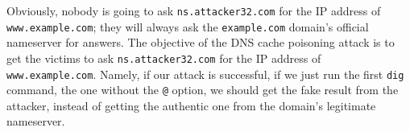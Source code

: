 Obviously, nobody is going to ask \texttt{ns.attacker32.com} for 
the IP address of \texttt{www.example.com}; they will always ask
the \texttt{example.com} domain's official nameserver for 
answers. The objective of the DNS cache poisoning attack
is to get the victims to ask 
\texttt{ns.attacker32.com} for the IP address of 
\texttt{www.example.com}. Namely, if our attack is successful, 
if we just run the first \texttt{dig} command, the one
without the \texttt{@} option, we should get the 
fake result from the attacker, instead of getting 
the authentic one from the domain's legitimate nameserver.


